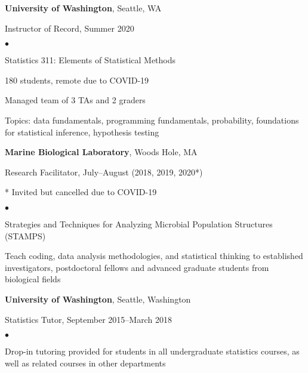 \documentclass[margin,centered]{res}
\newenvironment{list1}{
  \begin{list}{\ding{113}}{%
      \setlength{\itemsep}{0in}
      \setlength{\parsep}{0in} \setlength{\parskip}{0in}
      \setlength{\topsep}{0in} \setlength{\partopsep}{0in}
      \setlength{\leftmargin}{0.17in}}}{\end{list}}
\newenvironment{list2}{
  \begin{list}{$\bullet$}{%
      \setlength{\itemsep}{0in}
      \setlength{\parsep}{0in} \setlength{\parskip}{0in}
      \setlength{\topsep}{0in} \setlength{\partopsep}{0in}
      \setlength{\leftmargin}{0.2in}}}{\end{list}}
\begin{document}
\begin{resume}
{\bf University of Washington}, Seattle, WA
\begin{list1}
\item[] Instructor of Record, Summer 2020
\begin{list2}
\vspace*{.05in}
\item Statistics 311: Elements of Statistical Methods
\item \raisebox{.1em}{$\scriptstyle\mathtt{\sim}$}180 students, remote due to COVID-19
\item Managed team of 3 TAs and 2 graders
\item Topics: data fundamentals, programming fundamentals, probability, foundations for statistical inference, hypothesis testing
\end{list2}
\end{list1}



{\bf Marine Biological Laboratory}, Woods Hole, MA
\begin{list1}
\item[] Research Facilitator, July--August (2018, 2019, 2020*)
\item[] * Invited but cancelled due to COVID-19
\begin{list2}
\vspace*{.05in}
\item Strategies and Techniques for Analyzing Microbial Population Structures (STAMPS)
\item Teach coding, data analysis methodologies, and statistical thinking to established investigators, postdoctoral fellows and advanced graduate students from biological fields
\end{list2}
\end{list1}

{\bf University of Washington}, Seattle, Washington
\begin{list1}
\item[] Statistics Tutor, September 2015--March 2018
\begin{list2}
\vspace*{.05in}
\item Drop-in tutoring provided for students in all undergraduate statistics courses, as well as related courses in other departments
\end{list2}
\end{list1}


\end{resume}
\end{document}
